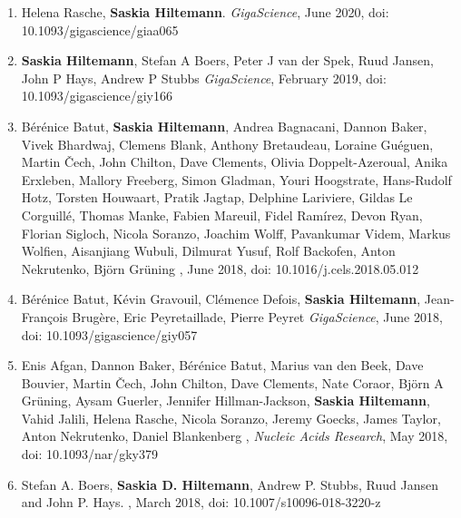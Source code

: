 \begin{enumerate}
\item Helena Rasche, \textbf{Saskia Hiltemann}. {\color{chaptergrey}{Galactic Circos: User-friendly Circos plots within the Galaxy platform.}} \textit{GigaScience}, June 2020, doi: 10.1093/gigascience/giaa065 \label{circos}

\item \textbf{Saskia Hiltemann}, Stefan A Boers, Peter J van der Spek, Ruud Jansen, John P Hays, Andrew P Stubbs {\color{chaptergrey}{Galaxy mothur Toolset (GmT): a user-friendly application for 16S rRNA gene sequencing analysis using mothur.}} \textit{GigaScience}, February 2019, doi: 10.1093/gigascience/giy166 \label{gmt}


\item Bérénice Batut, \textbf{Saskia Hiltemann}, Andrea Bagnacani, Dannon Baker, Vivek Bhardwaj, Clemens Blank, Anthony Bretaudeau, Loraine Guéguen, Martin Čech, John Chilton, Dave Clements, Olivia Doppelt-Azeroual, Anika Erxleben, Mallory Freeberg, Simon Gladman, Youri Hoogstrate, Hans-Rudolf Hotz, Torsten Houwaart, Pratik Jagtap, Delphine Lariviere, Gildas Le Corguillé, Thomas Manke, Fabien Mareuil, Fidel Ramírez, Devon Ryan, Florian Sigloch, Nicola Soranzo, Joachim Wolff, Pavankumar Videm, Markus Wolfien, Aisanjiang Wubuli, Dilmurat Yusuf, Rolf Backofen, Anton Nekrutenko, Björn Grüning {\color{chaptergrey}{Community-driven data analysis training for biology.}}, June 2018, doi: 10.1016/j.cels.2018.05.012 \label{gtn}

\item Bérénice Batut, Kévin Gravouil, Clémence Defois, \textbf{Saskia Hiltemann}, Jean-François Brugère, Eric Peyretaillade, Pierre Peyret {\color{chaptergrey}{ASaiM: a Galaxy-based framework to analyze raw shotgun data from microbiota.}} \textit{GigaScience}, June 2018, doi: 10.1093/gigascience/giy057

\item  Enis Afgan, Dannon Baker, Bérénice Batut, Marius van den Beek, Dave Bouvier, Martin Čech, John Chilton, Dave Clements, Nate Coraor, Björn A Grüning, Aysam Guerler, Jennifer Hillman-Jackson, \textbf{Saskia Hiltemann}, Vahid Jalili, Helena Rasche, Nicola Soranzo, Jeremy Goecks, James Taylor, Anton Nekrutenko, Daniel Blankenberg {\color{chaptergrey}{The Galaxy platform for accessible, reproducible and collaborative biomedical analyses: 2018 update }}, \textit{Nucleic Acids Research}, May 2018, doi: 10.1093/nar/gky379 \label{galaxy}

\item Stefan A. Boers, \textbf{Saskia D. Hiltemann}, Andrew P. Stubbs, Ruud Jansen and John P. Hays. {\color{chaptergrey}{Development and evaluation of a culture-free microbiota profiling platform (MYcrobiota) for clinical diagnostics}}, March 2018, doi: 10.1007/s10096-018-3220-z \label{MYcrobiota}


\end{enumerate}
